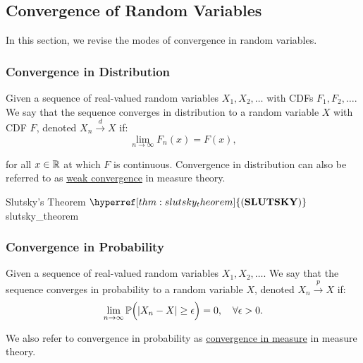 \subsection{Convergence of Random Variables}
\newcommand{\SLUTSKY}{\hyperref[thm:slutsky_theorem]{(\mathrm{{\bf SLUTSKY}})}}

In this section, we revise the modes of convergence in random variables. 
\subsubsection{Convergence in Distribution}
\begin{definition}
    Given a sequence of real-valued random variables $X_1, X_2, \dots$ with CDFs $F_1, F_2, \dots$. We say that the sequence converges in distribution to a random variable $X$ with CDF $F$, denoted $X_n\xrightarrow{d}X$ if:
    \begin{equation}
        \lim_{n\to\infty}F_n(x) = F(x),
    \end{equation}

    \noindent for all $x\in\mathbb{R}$ at which $F$ is continuous. Convergence in distribution can also be referred to as \underline{weak convergence} in measure theory.
\end{definition}

\begin{theorem}{Slutsky's Theorem $\SLUTSKY$}{slutsky_theorem}
     
\end{theorem} 

\begin{proof*}
     
\end{proof*} 

\subsubsection{Convergence in Probability}
\begin{definition}
    Given a sequence of real-valued random variables $X_1, X_2, \dots$. We say that the sequence converges in probability to a random variable $X$, denoted $X_n\xrightarrow{p}X$ if:
    \begin{equation}
        \lim_{n\to\infty} \mathbb{P}\Big( |X_n - X| \ge \epsilon \Big) = 0, \quad \forall \epsilon > 0.
    \end{equation}

    \noindent We also refer to convergence in probability as \underline{convergence in measure} in measure theory.
\end{definition}

